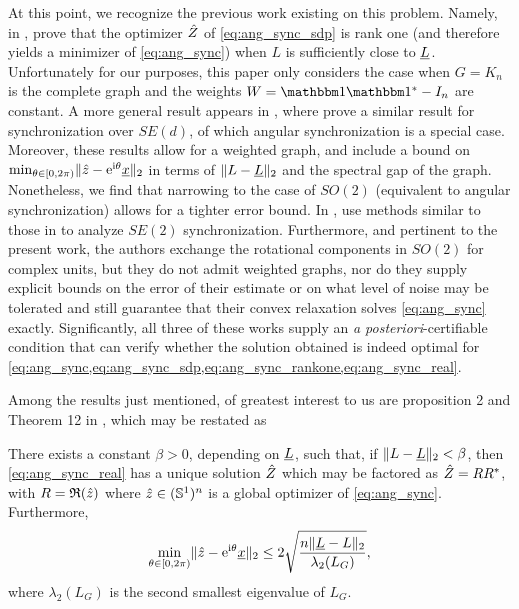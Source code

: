 
At this point, we recognize the previous work existing on this problem.  Namely, in \cite{bandeira2016tightness}, \citeauthor*{bandeira2016tightness} prove that the optimizer $\hat{Z}$ of \eqref{eq:ang_sync_sdp} is rank one (and therefore yields a minimizer of \eqref{eq:ang_sync}) when $L$ is sufficiently close to $\underline{L}$.  Unfortunately for our purposes, this paper only considers the case when $G = K_n$ is the complete graph and the weights $W = \one \one^* - I_n$ are constant.  A more general result appears in \cite{bandeira2016se_sync}, where \citeauthor*{bandeira2016se_sync} prove a similar result for synchronization over $SE(d)$, of which angular synchronization is a special case.  Moreover, these results allow for a weighted graph, and include a bound on $\min_{\theta \in [0, 2\pi)} \lVert \hat{z} - \mathrm{e}^{\mathrm{i}\theta} \underline{x}\rVert_2$ in terms of $\lVert L - \underline{L} \rVert_2$ and the spectral gap of the graph.  Nonetheless, we find that narrowing to the case of $SO(2)$ (equivalent to angular synchronization) allows for a tighter error bound.  In \cite{calafiore2016complex_pgo}, \citeauthor*{calafiore2016complex_pgo} use methods similar to those in \cite{bandeira2016se_sync} to analyze $SE(2)$ synchronization.  Furthermore, and pertinent to the present work, the authors exchange the rotational components in $SO(2)$ for complex units, but they do not admit weighted graphs, nor do they supply explicit bounds on the error of their estimate or on what level of noise may be tolerated and still guarantee that their convex relaxation solves \eqref{eq:ang_sync} exactly.  Significantly, all three of these works supply an \emph{a posteriori}-certifiable condition that can verify whether the solution obtained is indeed optimal for \cref{eq:ang_sync,eq:ang_sync_sdp,eq:ang_sync_rankone,eq:ang_sync_real}.

Among the results just mentioned, of greatest interest to us are proposition 2 and Theorem 12 in \cite{bandeira2016se_sync}, which may be restated as

\begin{proposition}
  There exists a constant $\beta > 0$, depending on $\underline{L}$, such that, if $\lVert L - \underline{L} \rVert_2 < \beta$, then \eqref{eq:ang_sync_real} has a unique solution $\hat{Z}$ which may be factored as $\hat{Z} = R R^*$, with $R = \mathfrak{R}(\hat{z})$ where $\hat{z} \in (\mathbb{S}^1)^n$ is a global optimizer of \eqref{eq:ang_sync}.  Furthermore, \[\min_{\theta \in [0, 2\pi)} \lVert \hat{z} - \mathrm{e}^{\mathrm{i} \theta} \underline{x} \rVert_2 \le 2 \sqrt{\dfrac{n \lVert \underline{L} - L \rVert_2}{\lambda_2(L_G)}},\] where $\lambda_2(L_G)$ is the second smallest eigenvalue of $L_G$.
\end{proposition}

